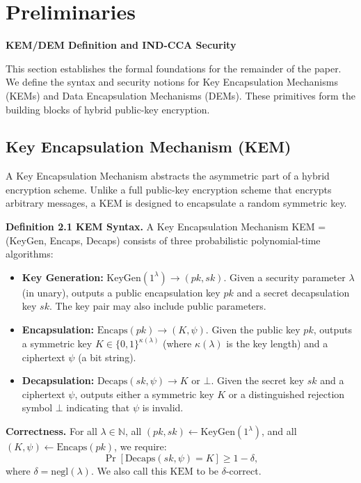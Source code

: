 \chapter{Preliminaries}
\begin{center}
\large \textbf{KEM/DEM Definition and IND-CCA Security}
\end{center}
\vspace{1em}

This section establishes the formal foundations for the remainder of the paper. We define the syntax and security notions for Key Encapsulation Mechanisms (KEMs) and Data Encapsulation Mechanisms (DEMs). These primitives form the building blocks of hybrid public-key encryption.

\section{Key Encapsulation Mechanism (KEM)}

A Key Encapsulation Mechanism abstracts the asymmetric part of a hybrid encryption scheme. Unlike a full public-key encryption scheme that encrypts arbitrary messages, a KEM is designed to encapsulate a random symmetric key.

\noindent\textbf{Definition 2.1 KEM Syntax.} A Key Encapsulation Mechanism KEM = (KeyGen, Encaps, Decaps) consists of three probabilistic polynomial-time algorithms:
\begin{itemize}
    \item \textbf{Key Generation:} $\text{KeyGen}(1^\lambda) \to (pk, sk)$. Given a security parameter $\lambda$ (in unary), outputs a public encapsulation key $pk$ and a secret decapsulation key $sk$. The key pair may also include public parameters.
    \item \textbf{Encapsulation:} $\text{Encaps}(pk) \to (K, \psi)$. Given the public key $pk$, outputs a symmetric key $K \in \{0,1\}^{\kappa(\lambda)}$ (where $\kappa(\lambda)$ is the key length) and a ciphertext $\psi$ (a bit string).
    \item \textbf{Decapsulation:} $\text{Decaps}(sk, \psi) \to K \text{ or } \bot$. Given the secret key $sk$ and a ciphertext $\psi$, outputs either a symmetric key $K$ or a distinguished rejection symbol $\bot$ indicating that $\psi$ is invalid.
\end{itemize}

\noindent\textbf{Correctness.} For all $\lambda \in \mathbb{N}$, all $(pk, sk) \gets \text{KeyGen}(1^\lambda)$, and all $(K, \psi) \gets \text{Encaps}(pk)$, we require: 
$$
\Pr[\text{Decaps}(sk, \psi) = K] \ge 1 - \delta,
$$
where $\delta = \text{negl}(\lambda)$. We also call this $\text{KEM}$ to be $\delta$-correct.

